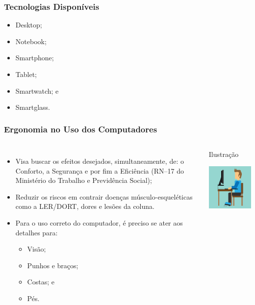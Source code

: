 \documentclass[aspectratio=169]{beamer} %
\begin{document}
\begin{frame}
	\frametitle{Tecnologias Disponíveis}
	
	\begin{itemize}
		\item Desktop;
		\item Notebook;
		\item Smartphone;
		\item Tablet;
		\item Smartwatch; e
		\item Smartglass.
	\end{itemize}
\end{frame}

\begin{frame}
	\frametitle{Ergonomia no Uso dos Computadores}

\begin{columns}
	\begin{itemize}
		\item Visa buscar os efeitos desejados, simultaneamente, de: o Conforto, a Segurança e por fim a Eficiência (RN--17 do Ministério do Trabalho e Previdência Social);
		\item  Reduzir os riscos em contrair doenças músculo-esqueléticas como a LER/DORT, dores e lesões da coluna.
		\item Para o uso correto do computador, é preciso se ater aos detalhes para:
		\begin{itemize}
			\item Visão;
			\item Punhos e bra\c cos;
			\item Costas; e
			\item Pés.
		\end{itemize}
	\end{itemize}

	\begin{exampleblock}{Ilustra\c cão}
		\begin{center}
			\includegraphics[scale=0.4]{img/ergonomia}
		\end{center}			
	\end{exampleblock}
\end{columns}
\end{frame}
\end{document}
